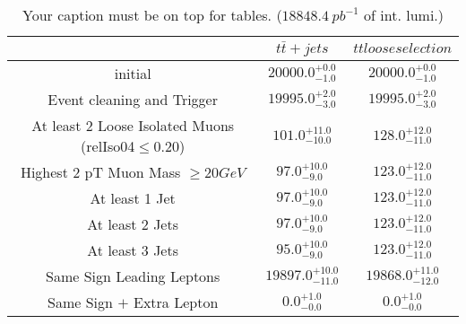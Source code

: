 \documentclass{article}
\begin{document}
\begin{table}
\caption{Your caption must be on top for tables. ($18848.4~pb^{-1}$ of int. lumi.)}
\label{tab:}
\centering
\begin{tabular}{|c|cc|}
\toprule
&$t\bar{t}+jets$	&$tt loose selection$	\\

\midrule
initial&	$20000.0^{+0.0}_{-1.0}$	&$20000.0^{+0.0}_{-1.0}$	\\

Event cleaning and Trigger&	$19995.0^{+2.0}_{-3.0}$	&$19995.0^{+2.0}_{-3.0}$	\\

At least 2 Loose Isolated Muons (relIso04$\leq 0.20$)&	$101.0^{+11.0}_{-10.0}$	&$128.0^{+12.0}_{-11.0}$	\\

Highest 2 pT Muon Mass $\geq 20 GeV$&	$97.0^{+10.0}_{-9.0}$	&$123.0^{+12.0}_{-11.0}$	\\

At least 1  Jet&	$97.0^{+10.0}_{-9.0}$	&$123.0^{+12.0}_{-11.0}$	\\

At least 2 Jets&	$97.0^{+10.0}_{-9.0}$	&$123.0^{+12.0}_{-11.0}$	\\

At least 3 Jets&	$95.0^{+10.0}_{-9.0}$	&$123.0^{+12.0}_{-11.0}$	\\

Same Sign Leading Leptons&	$19897.0^{+10.0}_{-11.0}$	&$19868.0^{+11.0}_{-12.0}$	\\

Same Sign $+$ Extra Lepton&	$0.0^{+1.0}_{-0.0}$	&$0.0^{+1.0}_{-0.0}$	\\

\bottomrule
\end{tabular}
\end{table}
\end{document}
